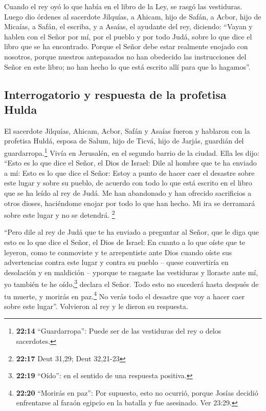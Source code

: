  Cuando el rey oyó lo que había en el libro de la Ley, se
rasgó las vestiduras.  Luego dio órdenes al sacerdote
Jilquías, a Ahicam, hijo de Safán, a Acbor, hijo de Micaías, a Safán, el
escriba, y a Asaías, el ayudante del rey, diciendo: 
``Vayan y hablen con el Señor por mí, por el pueblo y por todo Judá,
sobre lo que dice el libro que se ha encontrado. Porque el Señor debe
estar realmente enojado con nosotros, porque nuestros antepasados no han
obedecido las instrucciones del Señor en este libro; no han hecho lo que
está escrito allí para que lo hagamos''.

\hypertarget{interrogatorio-y-respuesta-de-la-profetisa-hulda}{%
\subsection{Interrogatorio y respuesta de la profetisa
Hulda}\label{interrogatorio-y-respuesta-de-la-profetisa-hulda}}

 El sacerdote Jilquías, Ahicam, Acbor, Safán y Asaías
fueron y hablaron con la profetisa Huldá, esposa de Salum, hijo de
Ticvá, hijo de Jarjás, guardián del guardarropa.\footnote{\textbf{22:14}
  ``Guardarropa'': Puede ser de las vestiduras del rey o delos
  sacerdotes.} Vivía en Jerusalén, en el segundo barrio de la ciudad.
 Ella les dijo: ``Esto es lo que dice el Señor, el Dios
de Israel: Dile al hombre que te ha enviado a mí:  Esto
es lo que dice el Señor: Estoy a punto de hacer caer el desastre sobre
este lugar y sobre su pueblo, de acuerdo con todo lo que está escrito en
el libro que se ha leído al rey de Judá.  Me han
abandonado y han ofrecido sacrificios a otros dioses, haciéndome enojar
por todo lo que han hecho. Mi ira se derramará sobre este lugar y no se
detendrá. \footnote{\textbf{22:17} Deut 31,29; Deut 32,21-23}

 ``Pero dile al rey de Judá que te ha enviado a preguntar
al Señor, que le diga que esto es lo que dice el Señor, el Dios de
Israel: En cuanto a lo que oíste que te leyeron,  como te
conmoviste y te arrepentiste ante Dios cuando oíste sus advertencias
contra este lugar y contra su pueblo -- quese convertiría en desolación
y en maldición -- yporque te rasgaste las vestiduras y lloraste ante mí,
yo también te he oído,\footnote{\textbf{22:19} ``Oído'': en el sentido
  de una respuesta positiva.} declara el Señor.  Todo
esto no sucederá hasta después de tu muerte, y morirás en
paz.\footnote{\textbf{22:20} ``Morirás en paz'': Por supuesto, esto no
  ocurrió, porque Josías decidió enfrentarse al faraón egipcio en la
  batalla y fue asesinado. Ver 23:29.} No verás todo el desastre que voy
a hacer caer sobre este lugar''. Volvieron al rey y le dieron su
respuesta.

